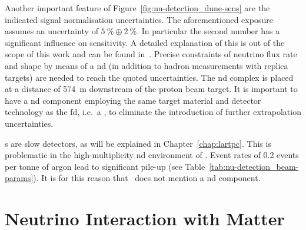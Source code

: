 Another important feature of Figure~\ref{fig:nu-detection_dune-sens} are the indicated signal normalisation uncertainties.
The aforementioned exposure assumes an uncertainty of $\SI{5}{\percent}\oplus\SI{2}{\percent}$.
In particular the second number has a significant influence on sensitivity.
A detailed explanation of this is out of the scope of this work and can be found in~\cite{dune2}.
Precise constraints of neutrino flux rate and shape by means of a \gls{nd} (in addition to hadron measurements with replica targets) are needed to reach the quoted uncertainties.
The \gls{nd} complex is placed at a distance of \SI{574}{\metre} downstream of the proton beam target.
It is important to have a \gls{nd} component employing the same target material and detector technology as the \gls{fd}, i.e.\ a \lartpc{}, to eliminate the introduction of further extrapolation uncertainties.

\lartpc{}s are slow detectors, as will be explained in Chapter~\ref{chap:lartpc}.
This is problematic in the high-multiplicity \gls{nd} environment of \dune{}.
Event rates of \num{0.2} events per tonne of argon lead to significant pile-up (see Table~\ref{tab:nu-detection_beam-params}).
It is for this reason that~\cite{dune2} does not mention a \gls{nd} \lar{} component.


\section{Neutrino Interaction with Matter}
\label{sec:nu-detection_interactions}

